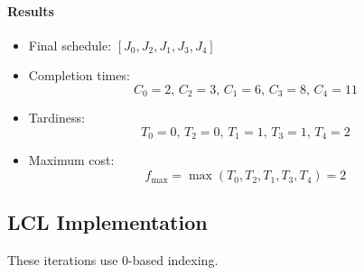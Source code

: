\documentclass[fleqn]{article}
\begin{document}
    \paragraph{Results}
    \begin{itemize}
        \item Final schedule: $[J_0, J_2, J_1, J_3, J_4]$
        \item Completion times:
        \[
        C_0 = 2, \, C_2 = 3, \, C_1 = 6, \, C_3 = 8, \, C_4 = 11
        \]
        \item Tardiness:
        \[
        T_0 = 0, \, T_2 = 0, \, T_1 = 1, \, T_3 = 1, \, T_4 = 2
        \]
        \item Maximum cost:
        \[
        f_{\text{max}} = \max(T_0, T_2, T_1, T_3, T_4) = 2
        \]
    \end{itemize}

    \subsection{LCL Implementation}
    These iterations use 0-based indexing.
\end{document}

